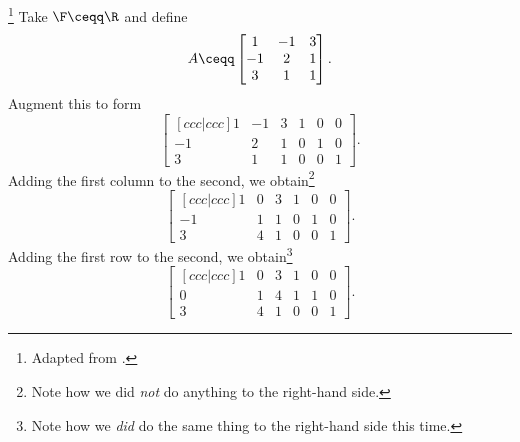\begin{exm}{}{}\footnote{Adapted from \cite[Example 6.8.6]{Friedberg}.}
	Take $\F \ceqq \R$ and define
	\begin{equation}
		A\ceqq \begin{bmatrix}1 & -1 & 3 \\ -1 & 2 & 1 \\ 3 & 1 & 1\end{bmatrix}.
	\end{equation}
	Augment this to form
	\begin{equation}
		\begin{bmatrix}[c c c | c c c]
			1 & -1 & 3 & 1 & 0 & 0 \\
			-1 & 2 & 1 & 0 & 1 & 0 \\
			3 & 1 & 1 & 0 & 0 & 1
		\end{bmatrix}.
	\end{equation}
	Adding the first column to the second, we obtain\footnote{Note how we did \emph{not} do anything to the right-hand side.}
	\begin{equation}
		\begin{bmatrix}[c c c | c c c]
			1 & 0 & 3 & 1 & 0 & 0 \\
			-1 & 1 & 1 & 0 & 1 & 0 \\
			3 & 4 & 1 & 0 & 0 & 1
		\end{bmatrix}.
	\end{equation}
	Adding the first row to the second, we obtain\footnote{Note how we \emph{did} do the same thing to the right-hand side this time.}
	\begin{equation}
		\begin{bmatrix}[c c c | c c c]
			1 & 0 & 3 & 1 & 0 & 0 \\
			0 & 1 & 4 & 1 & 1 & 0 \\
			3 & 4 & 1 & 0 & 0 & 1
		\end{bmatrix}.
	\end{equation}
	

\end{exm}
